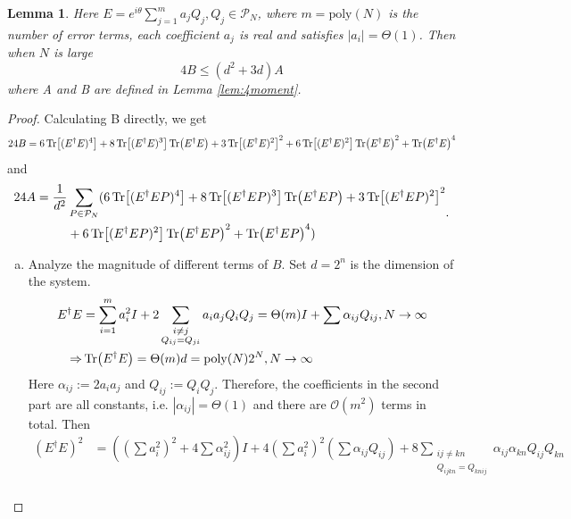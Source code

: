 \documentclass[showpacs,amsmath,amssymb,twocolumn,aps,pra,superscriptaddress,notitlepage,10pt]{revtex4-2}
\newtheorem{lemma}{Lemma}
\begin{document}
\begin{lemma} \label{lem:coeff}
    Here $E=e^{i\theta}\sum_{j=1}^{m} a_jQ_j,Q_j\in\mathcal P_N$, where $m=\mathrm{poly}(N)$ is the number of error terms, each coefficient $a_j$ is real and satisfies $|a_i|=\Theta(1)$. Then when $N$ is large
    \begin{equation}
        4B\leq(d^2+3d)A
    \end{equation}
    where A and B are defined in Lemma \ref{lem:4moment}.
\end{lemma}
\begin{proof}
    Calculating B directly, we get
    \begin{equation}
        24B = 6\Tr[(E^\dagger E)^4]+8\Tr[(E^\dagger E)^3]\Tr(E^\dagger E)+3\Tr[(E^\dagger E)^2]^2+6\Tr[(E^\dagger E)^2]\Tr(E^\dagger E)^2+\Tr(E^\dagger E)^4\label{equ:B}
    \end{equation}
    and
    \begin{equation}
        \begin{aligned}
            24A = \frac{1}{d^2}&\sum_{P\in\mathcal P_N}(6\Tr[(E^\dagger EP)^4]+8\Tr[(E^\dagger EP)^3]\Tr(E^\dagger EP)+3\Tr[(E^\dagger EP)^2]^2\\
            &+6\Tr[(E^{\dagger} EP)^2]\Tr(E^\dagger EP)^2+\Tr(E^\dagger EP)^4)
        \end{aligned}.\label{equ:A}
    \end{equation}
    \begin{enumerate}[(a)]
    \item Analyze the magnitude of different terms of $B$. Set $d=2^n$ is the dimension of the system.
        \begin{align}
            E^\dagger E&=\sum_{i=1}^{m} a_i^2 I+2\sum_{\substack{i\neq j\\Q_{ij}=Q_{ji}}} a_ia_jQ_iQ_j=\Theta(m)I+\sum\alpha_{ij}Q_{ij},N\rightarrow \infty\label{equ:EE}\\
            \Rightarrow &\Tr(E^\dagger E)=\Theta(m)d=\mathrm{poly}(N)2^{N},N\rightarrow\infty
        \end{align}
        Here $\alpha_{ij}:=2a_ia_j$ and $Q_{ij}:=Q_iQ_j$. Therefore, the coefficients in the second part are all constants, i.e. $|\alpha_{ij}|=\Theta(1)$ and there are $\mathcal O(m^2)$ terms in total. Then
        \begin{align}
            (E^\dagger E)^2&=\left((\sum a_i^2)^2+4\sum \alpha_{ij}^2\right)I+4(\sum a_i^2)^2\left(\sum\alpha_{ij}Q_{ij}\right)+8\sum_{\substack{ij\neq kn\\Q_{ijkn}=Q_{knij}}}\alpha_{ij}\alpha_{kn}Q_{ij}Q_{kn}\\

\end{align}
\end{enumerate}
\end{proof}
\end{document}
